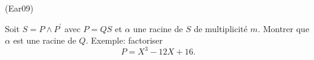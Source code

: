 \begin{tiny}(Ear09)\end{tiny} Soit $S=P\wedge P^{\prime }$ avec $P=QS$ et $\alpha$ une racine de $S$ de multiplicité $m$. Montrer que $\alpha$ est une racine de $Q$. Exemple: factoriser 
\[
 P = X^3 -12X +16.
\]
